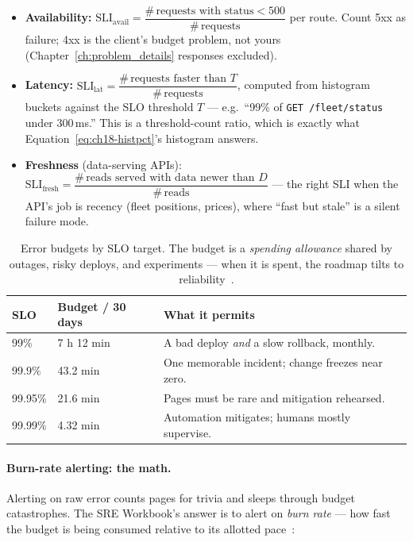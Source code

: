 \begin{itemize}
  \item \textbf{Availability:}
        $\text{SLI}_{\text{avail}} = \dfrac{\#\,\text{requests with status} < 500}
        {\#\,\text{requests}}$ per route. Count 5xx as failure; 4xx is the
        client's budget problem, not yours (Chapter~\ref{ch:problem_details}
        responses excluded).
  \item \textbf{Latency:}
        $\text{SLI}_{\text{lat}} = \dfrac{\#\,\text{requests faster than } T}
        {\#\,\text{requests}}$, computed from histogram buckets against the
        SLO threshold $T$ --- e.g.\ ``99\% of \texttt{GET /fleet/status}
        under 300\,ms.'' This is a threshold-count ratio, which is exactly
        what Equation~\eqref{eq:ch18-histpct}'s histogram answers.
  \item \textbf{Freshness} (data-serving APIs):
        $\text{SLI}_{\text{fresh}} = \dfrac{\#\,\text{reads served with data newer than } D}
        {\#\,\text{reads}}$ --- the right SLI when the API's job is
        recency (fleet positions, prices), where ``fast but stale'' is a
        silent failure mode.
\end{itemize}

\begin{table}[ht]
  \centering
  \small
  \begin{tabularx}{\textwidth}{l l X}
    \toprule
    \textbf{SLO} & \textbf{Budget / 30 days} & \textbf{What it permits} \\
    \midrule
    99\%    & 7 h 12 min  & A bad deploy \emph{and} a slow rollback, monthly. \\
    99.9\%  & 43.2 min    & One memorable incident; change freezes near zero. \\
    99.95\% & 21.6 min    & Pages must be rare and mitigation rehearsed. \\
    99.99\% & 4.32 min    & Automation mitigates; humans mostly supervise. \\
    \bottomrule
  \end{tabularx}
  \caption{Error budgets by SLO target. The budget is a \emph{spending
  allowance} shared by outages, risky deploys, and experiments --- when it
  is spent, the roadmap tilts to reliability~\cite{beyer2016sre}.}
  \label{tab:ch18-budgets}
\end{table}

\paragraph{Burn-rate alerting: the math.} Alerting on raw error counts
pages for trivia and sleeps through budget catastrophes. The SRE
Workbook's answer is to alert on \emph{burn rate} --- how fast the budget
is being consumed relative to its allotted pace~\cite{beyer2016sre}:

